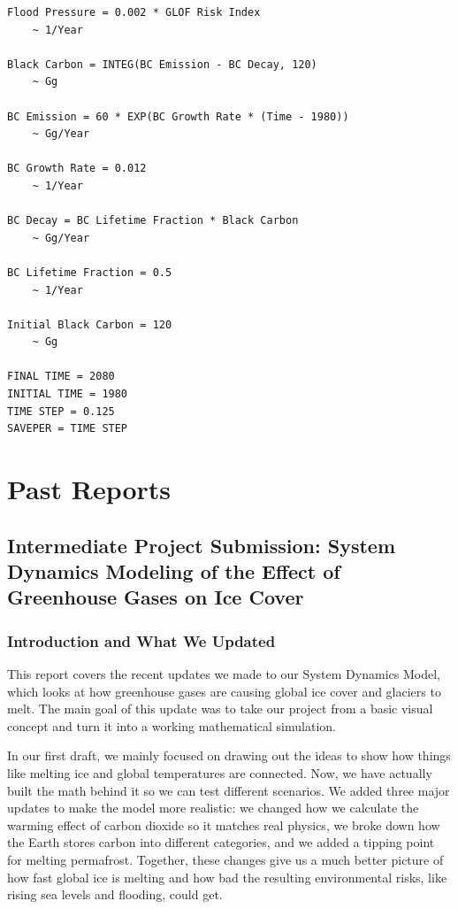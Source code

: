 \documentclass[12pt, a4paper]{article}
\begin{document}
\begin{verbatim}
Flood Pressure = 0.002 * GLOF Risk Index
    ~ 1/Year

Black Carbon = INTEG(BC Emission - BC Decay, 120)
    ~ Gg

BC Emission = 60 * EXP(BC Growth Rate * (Time - 1980))
    ~ Gg/Year

BC Growth Rate = 0.012
    ~ 1/Year

BC Decay = BC Lifetime Fraction * Black Carbon
    ~ Gg/Year

BC Lifetime Fraction = 0.5
    ~ 1/Year

Initial Black Carbon = 120
    ~ Gg

FINAL TIME = 2080
INITIAL TIME = 1980
TIME STEP = 0.125
SAVEPER = TIME STEP
\end{verbatim}

\section{Past Reports}

\subsection*{Intermediate Project Submission: System Dynamics Modeling of the Effect of Greenhouse Gases on Ice Cover}

\subsubsection*{Introduction and What We Updated}

This report covers the recent updates we made to our System Dynamics Model, which looks at how greenhouse gases are causing global ice cover and glaciers to melt. The main goal of this update was to take our project from a basic visual concept and turn it into a working mathematical simulation.

In our first draft, we mainly focused on drawing out the ideas to show how things like melting ice and global temperatures are connected. Now, we have actually built the math behind it so we can test different scenarios. We added three major updates to make the model more realistic: we changed how we calculate the warming effect of carbon dioxide so it matches real physics, we broke down how the Earth stores carbon into different categories, and we added a tipping point for melting permafrost. Together, these changes give us a much better picture of how fast global ice is melting and how bad the resulting environmental risks, like rising sea levels and flooding, could get.
\end{document}
